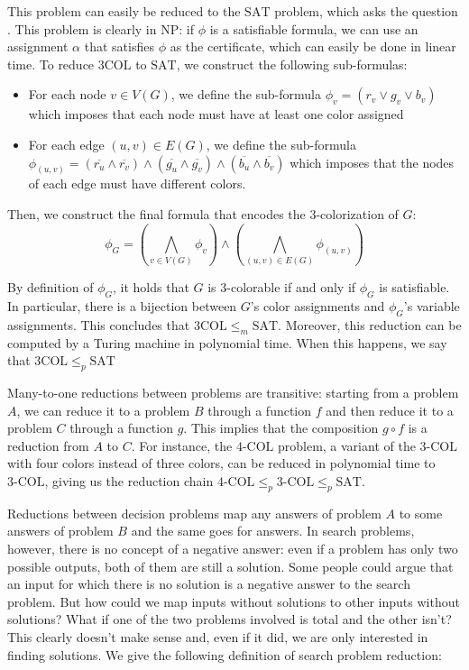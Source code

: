 This problem can easily be reduced to the $\mathrm{SAT}$ problem, which asks the question . This problem is clearly in \textsf{NP}: if $\phi$ is a satisfiable formula, we can use an assignment $\alpha$ that satisfies $\phi$ as the certificate, which can easily be done in linear time. To reduce $3\mathrm{COL}$ to $\mathrm{SAT}$, we construct the following sub-formulas:
\begin{itemize}
    \item For each node $v \in V(G)$, we define the sub-formula $\phi_v = (r_v \lor g_v \lor b_v)$ which imposes that each node must have at least one color assigned
    \item For each edge $(u,v) \in E(G)$, we define the sub-formula $\phi_{(u,v)} = (\overline{r_u} \land \overline{r_v}) \land (\overline{g_u} \land \overline{g_v}) \land (\overline{b_u} \land \overline{b_v})$ which imposes that the nodes of each edge must have different colors.
\end{itemize}

Then, we construct the final formula that encodes the 3-colorization of $G$:
\[\phi_G = \left ( \bigwedge_{v \in V(G)} \phi_v \right ) \land \left ( \bigwedge_{(u,v) \in E(G)} \phi_{(u,v)} \right )\]

By definition of $\phi_G$, it holds that $G$ is 3-colorable if and only if $\phi_G$ is satisfiable. In particular, there is a bijection between $G$'s color assignments and $\phi_G$'s variable assignments. This concludes that $3\mathrm{COL} \leq_m \mathrm{SAT}$. Moreover, this reduction can be computed by a Turing machine in polynomial time. When this happens, we say that $3\mathrm{COL} \leq_p \mathrm{SAT}$

Many-to-one reductions between problems are transitive: starting from a problem $A$, we can reduce it to a problem $B$ through a function $f$ and then reduce it to a problem $C$ through a function $g$. This implies that the composition $g \circ f$ is a reduction from $A$ to $C$. For instance, the $\mathrm{4\text{-}COL}$ problem, a variant of the $\mathrm{3\text{-}COL}$ with four colors instead of three colors, can be reduced in polynomial time to $\mathrm{3\text{-}COL}$, giving us the reduction chain $\mathrm{4\text{-}COL} \leq_p \mathrm{3\text{-}COL} \leq_p \mathrm{SAT}$.

Reductions between decision problems map any  answers of problem $A$ to some  answers of problem $B$ and the same goes for  answers. In search problems, however, there is no concept of a negative answer: even if a problem has only two possible outputs, both of them are still a solution. Some people could argue that an input for which there is no solution is a negative answer to the search problem. But how could we map inputs without solutions to other inputs without solutions? What if one of the two problems involved is total and the other isn't? This clearly doesn't make sense and, even if it did, we are only interested in finding solutions. We give the following definition of search problem reduction:

